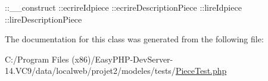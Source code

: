 \+::\+\_\+\+\_\+construct  \+::ecrire\+Idpiece  \+::ecrire\+Description\+Piece  \+::lire\+Idpiece  \+::lire\+Description\+Piece 

The documentation for this class was generated from the following file\+:\begin{DoxyCompactItemize}
\item 
C\+:/\+Program Files (x86)/\+Easy\+P\+H\+P-\/\+Dev\+Server-\/14.\+V\+C9/data/localweb/projet2/modeles/tests/\hyperlink{_piece_test_8php}{Piece\+Test.\+php}\end{DoxyCompactItemize}
